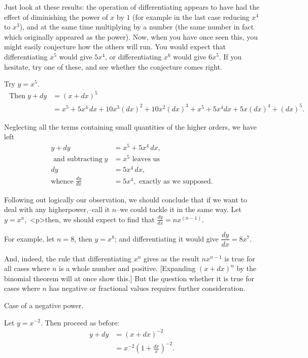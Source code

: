 \documentclass{ximera}
\begin{document}
\label{diffrule1}
Just look at these results: the operation of differentiating appears to have had the effect of diminishing
the power of $x$ by $1$ (for example in the last case reducing $x^4$ to $x^3$), and at the same time multiplying by a number (the same number in fact which originally appeared as the power). Now, when you have once seen this, you might easily conjecture how the others will run. You would expect that differentiating $x^5$ would give $5x^4$, or differentiating $x^6$ would give $6x^5$. If you hesitate, try one of these, and see whether the conjecture comes right.

Try $y = x^5$.
\begin{align*}
\text{   Then}\;
y+dy &= (x+dx)^5     \\
     &= x^5 + 5x^4\, dx + 10x^3(dx)^2  + 10x^2(dx)^3 + x^5 + 5x^4 dx + 5x(dx)^4 + (dx)^5.
\end{align*}

Neglecting all the terms containing small quantities of the higher orders, we have left
\begin{align*}
y + dy &= x^5 + 5x^4\, dx,  \\
\text{ and subtracting}\;
y &= x^5 \text{ leaves us} \\
dy &= 5x^4\, dx,  \\
 \text{whence}\;
\frac{dy}{dx} &= 5x^4, \text{ exactly as we supposed.}
\end{align*}

Following out logically our observation, we should conclude that if we want to deal with any higherpower,–call it $n$–we could tackle it in the same way.
Let $y = x^n,$ <p>then, we should expect to find that $\frac{dy}{dx} = nx^{(n-1)}$.

For example, let $n=8$, then $y=x^8$; and differentiating it would give $\dfrac{dy}{dx} = 8x^7$.

And, indeed, the rule that differentiating $x^n$ gives as the result $nx^{n-1}$ is true for all cases where $n$ is a whole number and positive. [Expanding $(x + dx)^n$ by the binomial theorem will at once show this.] But the question whether it is true for cases where $n$ has negative or fractional values requires further consideration.

Case of a negative power.

Let $y = x^{-2}$. Then proceed as before:
\begin{align*}
y+dy &= (x+dx)^{-2} \\
     &= x^{-2} \left(1 + \frac{dx}{x}\right)^{-2}.
\end{align*}
\end{document}
